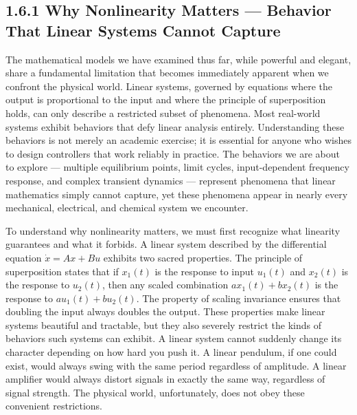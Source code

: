 \subsection{1.6.1 Why Nonlinearity Matters --- Behavior That Linear Systems Cannot Capture}

The mathematical models we have examined thus far, while powerful and elegant, share a fundamental limitation that becomes immediately apparent when we confront the physical world. Linear systems, governed by equations where the output is proportional to the input and where the principle of superposition holds, can only describe a restricted subset of phenomena. Most real-world systems exhibit behaviors that defy linear analysis entirely. Understanding these behaviors is not merely an academic exercise; it is essential for anyone who wishes to design controllers that work reliably in practice. The behaviors we are about to explore --- multiple equilibrium points, limit cycles, input-dependent frequency response, and complex transient dynamics --- represent phenomena that linear mathematics simply cannot capture, yet these phenomena appear in nearly every mechanical, electrical, and chemical system we encounter.

To understand why nonlinearity matters, we must first recognize what linearity guarantees and what it forbids. A linear system described by the differential equation $\dot{x} = Ax + Bu$ exhibits two sacred properties. The principle of superposition states that if $x_1(t)$ is the response to input $u_1(t)$ and $x_2(t)$ is the response to $u_2(t)$, then any scaled combination $a x_1(t) + b x_2(t)$ is the response to $a u_1(t) + b u_2(t)$. The property of scaling invariance ensures that doubling the input always doubles the output. These properties make linear systems beautiful and tractable, but they also severely restrict the kinds of behaviors such systems can exhibit. A linear system cannot suddenly change its character depending on how hard you push it. A linear pendulum, if one could exist, would always swing with the same period regardless of amplitude. A linear amplifier would always distort signals in exactly the same way, regardless of signal strength. The physical world, unfortunately, does not obey these convenient restrictions.

